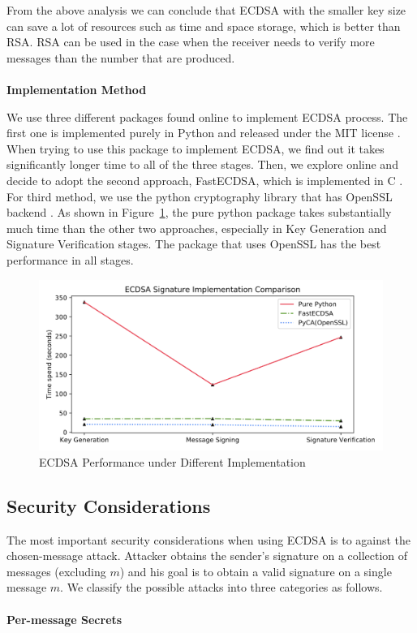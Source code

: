 \documentclass[10pt,sigconf]{acmart}
\begin{document}
From the above analysis we can conclude that ECDSA with the smaller key size can save a lot of resources such as time and space storage, which is better than RSA. RSA can be used in the case when the receiver needs to verify more messages than the number that are produced. 
\\
\\
\noindent \textbf{Implementation Method}

We use three different packages found online to implement ECDSA process. The first one is implemented purely in Python and released under the MIT license \cite{BrianWarnerECDSA}. When trying to use this package to implement ECDSA, we find out it takes significantly longer time to all of the three stages. Then, we explore online and decide to adopt the second approach, FastECDSA, which is implemented in C \cite{AntonKueltzECDSA}. For third method, we use the python cryptography library that has OpenSSL backend \cite{PyCACryptography}. As shown in Figure~\ref{fig:ECDSA_Implementation_Compare_Steps}, the pure python package takes substantially much time than the other two approaches, especially in Key Generation and Signature Verification stages. The package that uses OpenSSL has the best performance in all stages.

\begin{figure}[H]
\centering
\includegraphics[scale=0.45]{ECDSA_Implementation_Compare_Steps}
\caption{\small{ECDSA Performance under Different Implementation}}
\label{fig:ECDSA_Implementation_Compare_Steps}
\end{figure}

\subsection{Security Considerations}

The most important security considerations when using ECDSA is to against the chosen-message attack. Attacker obtains the sender's signature on a collection of messages (excluding $m$) and his goal is to obtain a valid signature on a single message $m$. We classify the possible attacks into three categories as follows. 
\\
\\
\noindent \textbf{Per-message Secrets}
\end{document}
